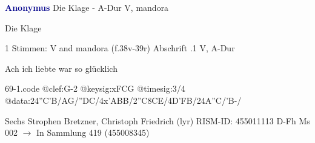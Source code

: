\documentclass[twocolumn]{book}
\begin{document}
\newline \par \vspace{7pt} \textcolor{darkblue}{\textbf{Anonymus  }}
\newline Die Klage - A-Dur
\newline V, mandora
\newline \begin{itshape}[heading, f.38v:] Die Klage\end{itshape} 
\newline \textcolor{darkblue}{}  1 Stimmen: V and mandora  (f.38v-39r)
\newline Abschrift
.1  V, A-Dur
\newline \begin{footnotesize} Ach ich liebte war so glücklich \end{footnotesize}  
\begin{filecontents*}{69-1.code}
@clef:G-2
@keysig:xFCG
@timesig:3/4
@data:24''C'B/AG/''DC/4x'ABB/2''C{8CE}/4D'FB/24A''C/'B-/
\end{filecontents*}
\newline
%
\newline Sechs Strophen
\newline Bretzner, Christoph Friedrich  (lyr)
\newline RISM-ID: 455011113
\newline D-Fh  Ms 002
\newline $\rightarrow$ In Sammlung 419 (455008345)
      
\end{document}
